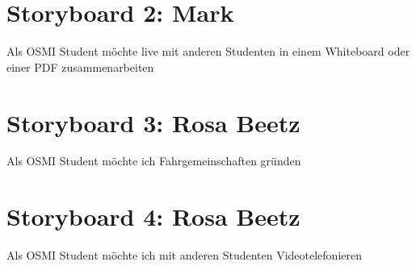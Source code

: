\documentclass{article}
\begin{document}
\newpage

\section{Storyboard 2: Mark}

Als OSMI Student möchte live mit anderen Studenten in einem Whiteboard oder einer PDF zusammenarbeiten

\newpage

\section{Storyboard 3: Rosa Beetz}

Als OSMI Student möchte ich Fahrgemeinschaften gründen

\newpage

\section{Storyboard 4: Rosa Beetz}

Als OSMI Student möchte ich mit anderen Studenten Videotelefonieren

\newpage
\end{document}
